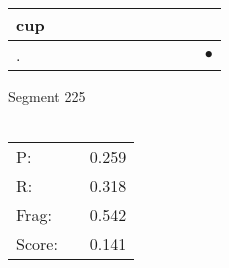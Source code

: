 \documentclass[landscape]{article}
\newcommand{\ssp}{\hspace{2pt}}
\newcommand{\mex}{\cellcolor{g}$\bullet$}
\begin{document}
\begin{tabular}{|l|p{10pt}|p{10pt}|p{10pt}|p{10pt}|p{10pt}|p{10pt}|p{10pt}|p{10pt}|p{10pt}|p{10pt}|}
\hline
\ssp cup \ssp&\hspace{2pt}&\hspace{2pt}&\hspace{2pt}&\hspace{2pt}&\hspace{2pt}&\hspace{2pt}&\hspace{2pt}&\hspace{2pt}&\hspace{2pt}&\hspace{2pt}\\
\hline
\ssp \cellcolor{ref9}. \ssp&\hspace{2pt}&\hspace{2pt}&\hspace{2pt}&\hspace{2pt}&\hspace{2pt}&\hspace{2pt}&\hspace{2pt}&\hspace{2pt}&\hspace{2pt}&\hspace{2pt}\mex\\
\hline
\end{tabular}

\vspace{6pt}
\noindent Segment 225\\\\
\noindent\begin{tabular}{lm{12pt}r}
\hline
P:&&0.259\\
R:&&0.318\\
Frag:&&0.542\\
Score:&&0.141\\
\end{tabular}

\newpage
\end{document}

